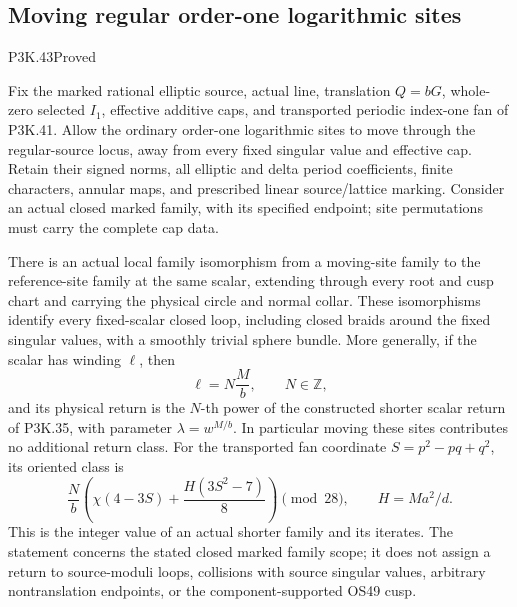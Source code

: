 \subsection{Moving regular order-one logarithmic sites}
\begin{statement}{P3K.43}{Proved}

Fix the marked rational elliptic source, actual line, translation
\(Q=bG\), whole-zero selected \(I_1\), effective additive caps,
and transported periodic index-one fan of P3K.41. Allow the ordinary
order-one logarithmic sites to move through the regular-source locus,
away from every fixed singular value and effective cap. Retain their
signed norms, all elliptic and delta period coefficients, finite
characters, annular maps, and prescribed linear source/lattice marking.
Consider an actual closed marked family, with its specified endpoint;
site permutations must carry the complete cap data.

There is an actual local family isomorphism from a moving-site family
to the reference-site family at the same scalar, extending through every
root and cusp chart and carrying the physical circle and normal collar.
These isomorphisms identify every fixed-scalar closed loop, including
closed braids around the fixed singular values, with a smoothly trivial
sphere bundle. More generally, if the scalar has winding \(\ell\),
then
\[
                    \ell=N\frac{M}{b},\qquad N\in\mathbb Z,
\]
and its physical return is the \(N\)-th power of the constructed
shorter scalar return of P3K.35, with parameter
\(\lambda=w^{M/b}\). In particular moving these sites contributes
no additional return class. For the transported fan coordinate
\(S=p^2-pq+q^2\), its oriented class is
\[
 \frac{N}{b}\left(\chi(4-3S)+\frac{H(3S^2-7)}8\right)
             \pmod {28},\qquad H=Ma^2/d.
\]
This is the integer value of an actual shorter family and its iterates.
The statement concerns the stated closed marked family scope; it does
not assign a return to source-moduli loops, collisions with source
singular values, arbitrary nontranslation endpoints, or the
component-supported OS49 cusp.

\end{statement}
